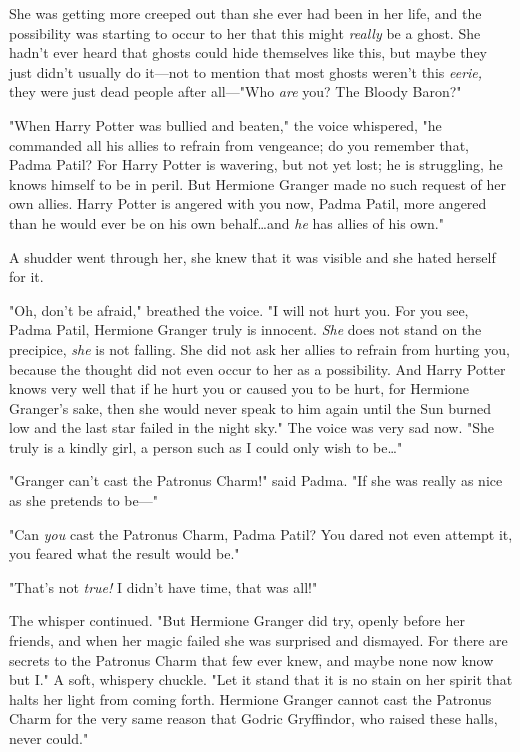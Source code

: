 She was getting more creeped out than she ever had been in her life, and the
possibility was starting to occur to her that this might \emph{really} be a
ghost. She hadn’t ever heard that ghosts could hide themselves like this, but
maybe they just didn’t usually do it—not to mention that most ghosts weren’t
this \emph{eerie,} they were just dead people after all—"Who \emph{are} you?
The Bloody Baron?"

"When Harry Potter was bullied and beaten," the voice whispered, "he commanded
all his allies to refrain from vengeance; do you remember that, Padma Patil?
For Harry Potter is wavering, but not yet lost; he is struggling, he knows
himself to be in peril. But Hermione Granger made no such request of her own
allies. Harry Potter is angered with you now, Padma Patil, more angered than he
would ever be on his own behalf…and \emph{he} has allies of his own."

A shudder went through her, she knew that it was visible and she hated herself
for it.

"Oh, don’t be afraid," breathed the voice. "I will not hurt you. For you see,
Padma Patil, Hermione Granger truly is innocent. \emph{She} does not stand on
the precipice, \emph{she} is not falling. She did not ask her allies to refrain
from hurting you, because the thought did not even occur to her as a
possibility. And Harry Potter knows very well that if he hurt you or caused you
to be hurt, for Hermione Granger’s sake, then she would never speak to him
again until the Sun burned low and the last star failed in the night sky." The
voice was very sad now. "She truly is a kindly girl, a person such as I could
only wish to be…"

"Granger can’t cast the Patronus Charm!" said Padma. "If she was really as nice
as she pretends to be—"

"Can \emph{you} cast the Patronus Charm, Padma Patil? You dared not even
attempt it, you feared what the result would be."

"That’s not \emph{true!} I didn’t have time, that was all!"

The whisper continued. "But Hermione Granger did try, openly before her
friends, and when her magic failed she was surprised and dismayed. For there
are secrets to the Patronus Charm that few ever knew, and maybe none now know
but I." A soft, whispery chuckle. "Let it stand that it is no stain on her
spirit that halts her light from coming forth. Hermione Granger cannot cast the
Patronus Charm for the very same reason that Godric Gryffindor, who raised
these halls, never could."

